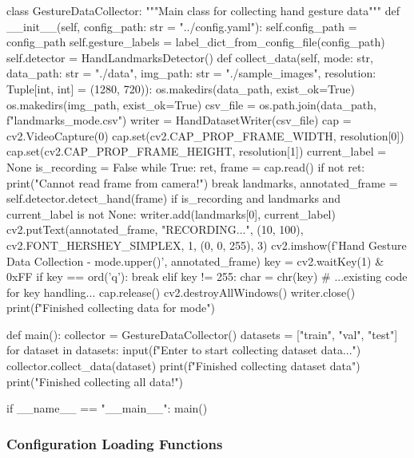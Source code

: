 \begin{aivncodebox}
\begin{python}
class GestureDataCollector:
    """Main class for collecting hand gesture data"""
    def __init__(self, config_path: str = "../config.yaml"):
        self.config_path = config_path
        self.gesture_labels = label_dict_from_config_file(config_path)
        self.detector = HandLandmarksDetector()
    def collect_data(self, mode: str, data_path: str = "./data", img_path: str = "./sample_images", resolution: Tuple[int, int] = (1280, 720)):
        os.makedirs(data_path, exist_ok=True)
        os.makedirs(img_path, exist_ok=True)
        csv_file = os.path.join(data_path, f"landmarks_{mode}.csv")
        writer = HandDatasetWriter(csv_file)
        cap = cv2.VideoCapture(0)
        cap.set(cv2.CAP_PROP_FRAME_WIDTH, resolution[0])
        cap.set(cv2.CAP_PROP_FRAME_HEIGHT, resolution[1])
        current_label = None
        is_recording = False
        while True:
            ret, frame = cap.read()
            if not ret:
                print("Cannot read frame from camera!")
                break
            landmarks, annotated_frame = self.detector.detect_hand(frame)
            if is_recording and landmarks and current_label is not None:
                writer.add(landmarks[0], current_label)
                cv2.putText(annotated_frame, "RECORDING...", (10, 100),
                           cv2.FONT_HERSHEY_SIMPLEX, 1, (0, 0, 255), 3)
            cv2.imshow(f'Hand Gesture Data Collection - {mode.upper()}', annotated_frame)
            key = cv2.waitKey(1) & 0xFF
            if key == ord('q'):
                break
            elif key != 255:
                char = chr(key)
                # ...existing code for key handling...
        cap.release()
        cv2.destroyAllWindows()
        writer.close()
        print(f"Finished collecting data for {mode}")

def main():
    collector = GestureDataCollector()
    datasets = ["train", "val", "test"]
    for dataset in datasets:
        input(f"\nPress Enter to start collecting {dataset} data...")
        collector.collect_data(dataset)
        print(f"Finished collecting {dataset} data\n")
    print("Finished collecting all data!")

if __name__ == "__main__":
    main()
\end{python}
\end{aivncodebox}

\subsubsection{Configuration Loading Functions}

